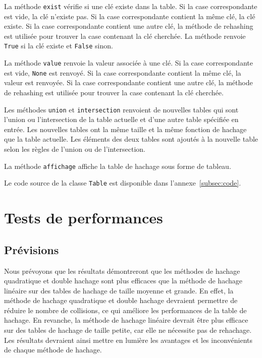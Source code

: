 \documentclass{article}
\begin{document}
    La méthode \texttt{exist} vérifie si une clé existe dans la table.
    Si la case correspondante est vide, la clé n'existe pas.
    Si la case correspondante contient la même clé, la clé existe.
    Si la case correspondante contient une autre clé, la méthode de rehashing est utilisée pour trouver la case contenant la clé cherchée.
    La méthode renvoie \texttt{True} si la clé existe et \texttt{False} sinon.

    La méthode \texttt{value} renvoie la valeur associée à une clé.
    Si la case correspondante est vide, \texttt{None} est renvoyé.
    Si la case correspondante contient la même clé, la valeur est renvoyée.
    Si la case correspondante contient une autre clé, la méthode de rehashing est utilisée pour trouver la case contenant la clé cherchée.

    Les méthodes \texttt{union} et \texttt{intersection} renvoient de nouvelles tables qui sont l'union ou l'intersection de la table actuelle et d'une autre table spécifiée en entrée.
    Les nouvelles tables ont la même taille et la même fonction de hachage que la table actuelle.
    Les éléments des deux tables sont ajoutés à la nouvelle table selon les règles de l'union ou de l'intersection.

    La méthode \texttt{affichage} affiche la table de hachage sous forme de tableau.

    Le code source de la classe \texttt{Table} est disponible dans l'annexe~\ref{subsec:code}.

    \newpage
    \section{Tests de performances}\label{sec:tests}

    \subsection{Prévisions}\label{subsec:previsions}

    Nous prévoyons que les résultats démontreront que les méthodes de hachage quadratique et double hachage sont plus efficaces que la méthode de hachage linéaire sur des tables de hachage de taille moyenne et grande.
    En effet, la méthode de hachage quadratique et double hachage devraient permettre de réduire le nombre de collisions, ce qui améliore les performances de la table de hachage.
    En revanche, la méthode de hachage linéaire devrait être plus efficace sur des tables de hachage de taille petite, car elle ne nécessite pas de rehachage.
    Les résultats devraient ainsi mettre en lumière les avantages et les inconvénients de chaque méthode de hachage.
\end{document}
